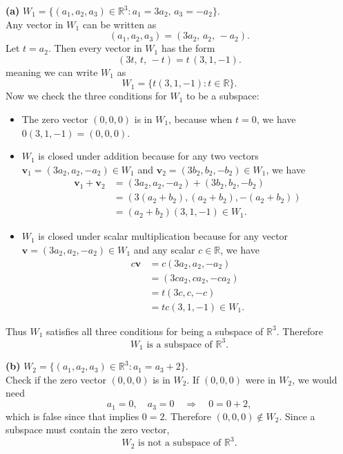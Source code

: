 \documentclass{article}
\begin{document}
\noindent
\textbf{(a)} $W_1 = \{(a_1,a_2,a_3) \in \mathbb{R}^3 : a_1 = 3a_2,\, a_3 = -a_2\}$. \\
\noindent
Any vector in $W_1$ can be written as
\[
(a_1, a_2, a_3) = (3a_2,\, a_2,\, -a_2).
\]
Let $t = a_2$. Then every vector in $W_1$ has the form
\[
(3t,\, t,\, -t) = t\,(3, 1, -1).
\]
meaning we can write $W_1$ as
\[
W_1 = \{t(3,1,-1) : t \in \mathbb{R}\}.
\]
Now we check the three conditions for $W_1$ to be a subspace:
\begin{itemize}
    \item The zero vector $(0,0,0)$ is in $W_1$, because when $t = 0$, we have $0(3,1,-1) = (0,0,0)$.
    \item $W_1$ is closed under addition because for any two vectors $\mathbf{v}_1 = (3a_2,a_2,-a_2) \in W_1$ and $\mathbf{v}_2 = (3b_2,b_2,-b_2) \in W_1$, we have
\begin{align*}
\mathbf{v}_1 + \mathbf{v}_2 &= (3a_2,a_2,-a_2) + (3b_2,b_2,-b_2) \\
                              &= (3(a_2+b_2),(a_2+b_2),-(a_2+b_2)) \\
                              &= (a_2 + b_2)(3,1,-1) \in W_1.
\end{align*}
    \item $W_1$ is closed under scalar multiplication because for any vector $\mathbf{v} = (3a_2,a_2,-a_2) \in W_1$ and any scalar $c \in \mathbb{R}$, we have
\begin{align*}
c\mathbf{v} &= c(3a_2,a_2,-a_2) \\
            &= (3ca_2,ca_2,-ca_2) \\
            &= t(3c,c,-c) \\
            &= tc(3,1,-1) \in W_1.
\end{align*}
\end{itemize}
Thus $W_1$ satisfies all three conditions for being a subspace of $\mathbb{R}^3$. Therefore
\[
\boxed{W_1 \text{ is a subspace of } \mathbb{R}^3.}
\]

\bigskip

\noindent
\textbf{(b)} $W_2 = \{(a_1,a_2,a_3) \in \mathbb{R}^3 : a_1 = a_3 + 2\}$.\\
\noindent
Check if the zero vector $(0,0,0)$ is in $W_2$. If $(0,0,0)$ were in $W_2$, we would need
\[
a_1 = 0, \quad a_3 = 0 \quad \Longrightarrow \quad 0 = 0 + 2,
\]
which is false since that implies $0=2$. Therefore $(0,0,0) \notin W_2$. Since a subspace must contain the zero vector, 
\[
\boxed{W_2 \text{ is not a subspace of } \mathbb{R}^3.}
\]
\end{document}
